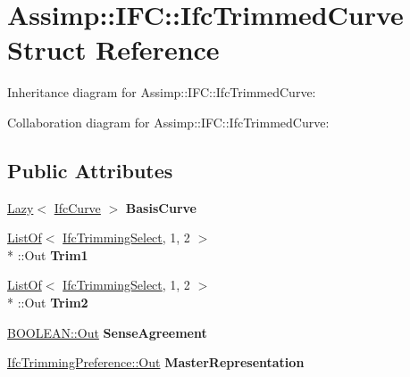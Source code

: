\hypertarget{struct_assimp_1_1_i_f_c_1_1_ifc_trimmed_curve}{\section{Assimp\+:\+:I\+F\+C\+:\+:Ifc\+Trimmed\+Curve Struct Reference}
\label{struct_assimp_1_1_i_f_c_1_1_ifc_trimmed_curve}
}


Inheritance diagram for Assimp\+:\+:I\+F\+C\+:\+:Ifc\+Trimmed\+Curve\+:


Collaboration diagram for Assimp\+:\+:I\+F\+C\+:\+:Ifc\+Trimmed\+Curve\+:
\subsection*{Public Attributes}
\begin{DoxyCompactItemize}
\item 
\hypertarget{struct_assimp_1_1_i_f_c_1_1_ifc_trimmed_curve_a190e20d162b72c8fa06c60b01d936842}{\hyperlink{struct_assimp_1_1_s_t_e_p_1_1_lazy}{Lazy}$<$ \hyperlink{struct_assimp_1_1_i_f_c_1_1_ifc_curve}{Ifc\+Curve} $>$ {\bfseries Basis\+Curve}}\label{struct_assimp_1_1_i_f_c_1_1_ifc_trimmed_curve_a190e20d162b72c8fa06c60b01d936842}

\item 
\hypertarget{struct_assimp_1_1_i_f_c_1_1_ifc_trimmed_curve_a9c3b842e8e1bfb01c1b939b1318bc34c}{\hyperlink{struct_assimp_1_1_s_t_e_p_1_1_list_of}{List\+Of}$<$ \hyperlink{class_assimp_1_1_s_t_e_p_1_1_e_x_p_r_e_s_s_1_1_data_type}{Ifc\+Trimming\+Select}, 1, 2 $>$\\*
\+::Out {\bfseries Trim1}}\label{struct_assimp_1_1_i_f_c_1_1_ifc_trimmed_curve_a9c3b842e8e1bfb01c1b939b1318bc34c}

\item 
\hypertarget{struct_assimp_1_1_i_f_c_1_1_ifc_trimmed_curve_ae75ce1427eb9fce4b9c24b8f3c6af550}{\hyperlink{struct_assimp_1_1_s_t_e_p_1_1_list_of}{List\+Of}$<$ \hyperlink{class_assimp_1_1_s_t_e_p_1_1_e_x_p_r_e_s_s_1_1_data_type}{Ifc\+Trimming\+Select}, 1, 2 $>$\\*
\+::Out {\bfseries Trim2}}\label{struct_assimp_1_1_i_f_c_1_1_ifc_trimmed_curve_ae75ce1427eb9fce4b9c24b8f3c6af550}

\item 
\hypertarget{struct_assimp_1_1_i_f_c_1_1_ifc_trimmed_curve_ae2eca5fa794f4a816bf3b969ae0beb56}{\hyperlink{classboost_1_1shared__ptr}{B\+O\+O\+L\+E\+A\+N\+::\+Out} {\bfseries Sense\+Agreement}}\label{struct_assimp_1_1_i_f_c_1_1_ifc_trimmed_curve_ae2eca5fa794f4a816bf3b969ae0beb56}

\item 
\hypertarget{struct_assimp_1_1_i_f_c_1_1_ifc_trimmed_curve_a77c281b5d6cd3722d936d7d110bad94c}{\hyperlink{classboost_1_1shared__ptr}{Ifc\+Trimming\+Preference\+::\+Out} {\bfseries Master\+Representation}}\label{struct_assimp_1_1_i_f_c_1_1_ifc_trimmed_curve_a77c281b5d6cd3722d936d7d110bad94c}

\end{DoxyCompactItemize}
